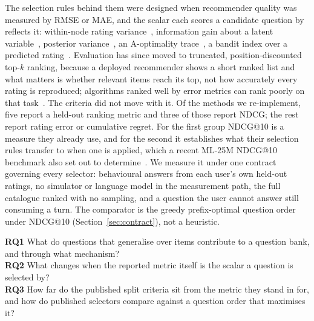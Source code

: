 \documentclass[runningheads]{llncs}
\begin{document}
The selection rules behind them were designed when recommender quality was measured by RMSE or MAE,
and the scalar each scores a candidate question by reflects
it: within-node rating variance~\cite{golbandi2011adaptive}, information gain about a latent
variable~\cite{ma2019eddi}, posterior variance~\cite{houlsby2011bald}, an A-optimality
trace~\cite{anava2015budget,sepliarskaia2018spq}, a bandit index over a predicted
rating~\cite{zhao2013interactive,zhang2020conucb}. Evaluation has since moved to truncated, position-discounted top-$k$ ranking, because a deployed
recommender shows a short ranked list and what matters is whether relevant items reach its top,
not how accurately every rating is reproduced; algorithms ranked well by error metrics can rank
poorly on that task~\cite{cremonesi2010performance,dacrema2019progress,krichene2020sampled}. The
criteria did not move with it. Of the methods we re-implement, five report a held-out ranking metric
and three of those report NDCG; the rest report rating error or cumulative regret. For the first
group NDCG@10 is a measure they already use, and for the second it establishes what their selection
rules transfer to when one is applied, which a recent ML-25M NDCG@10 benchmark also set out to
determine~\cite{proissl2024greedyslim}. We measure it under one contract governing every selector: behavioural answers from each user's
own held-out ratings, no simulator or language model in the measurement path, the full catalogue
ranked with no sampling, and a question the user cannot answer still consuming a turn. The
comparator is the greedy prefix-optimal question order under NDCG@10
(Section~\ref{sec:contract}), not a heuristic.

\medskip
\noindent
\textbf{RQ1} What do questions that generalise over items contribute to a question bank, and
through what mechanism?\\
\textbf{RQ2} What changes when the reported metric itself is the scalar a question is selected by?\\
\textbf{RQ3} How far do the published split criteria sit from the metric they stand in for, and how
do published selectors compare against a question order that maximises it?
\medskip
\end{document}
